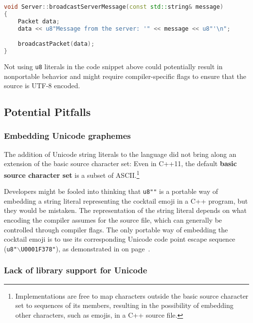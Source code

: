 \begin{lstlisting}[language=C++]
void Server::broadcastServerMessage(const std::string& message)
{
    Packet data;
    data << u8"Message from the server: '" << message << u8"'\n";

    broadcastPacket(data);
}
\end{lstlisting}

\noindent Not using \texttt{u8} literals in the code snippet above could potentially result in
nonportable behavior and might require compiler-specific flags to
ensure that the source is UTF-8 encoded.

\subsection[Potential Pitfalls]{Potential Pitfalls}\label{potential-pitfalls}

\subsubsection[Embedding Unicode graphemes]{Embedding Unicode graphemes}\label{embedding-unicode-graphemes}

The addition of Unicode string literals to the language did not bring
along an extension of the basic source character set: Even in C++11, the
default \textbf{basic source character set} is a subset of
ASCII.{\cprotect\footnote{Implementations are free to map characters
outside the basic source character set to sequences of its members,
resulting in the possibility of embedding other characters, such as emojis, in a C++ source file.}}

Developers might be fooled into thinking that \texttt{u8"\martini"} is a
portable way of embedding a string literal representing the cocktail
emoji in a C++ program, but they would be mistaken. The representation of the string literal depends on what
encoding the compiler assumes for the source file, which can generally
be controlled through compiler flags. The only portable way of embedding
the cocktail emoji is to use its corresponding Unicode code point escape
sequence (\texttt{u8"$\backslash$U0001F378"}), as demonstrated in
\textit{} on page~\pageref{description-unicodestring}.

\subsubsection[Lack of library support for Unicode]{Lack of library support for Unicode}\label{lack-of-library-support-for-unicode}

